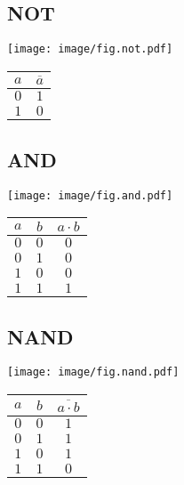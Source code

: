 
\begin{multicols}{4}

	\subsection*{NOT}
	\begin{minipage}[t][2em][c]{\linewidth}
		\centering
		\texttt{[image: image/fig.not.pdf]}
	\end{minipage}
	\begin{center}
		\begin{tabular}{c|c}
			\toprule
			$a$ & $\overline{a}$ \\
			\midrule
			$0$ & $1$            \\
			$1$ & $0$            \\
			\bottomrule
		\end{tabular}
	\end{center}

	\newcolumn

	\subsection*{AND}

	\begin{minipage}[t][2em][c]{\linewidth}
		\centering
		\texttt{[image: image/fig.and.pdf]}
	\end{minipage}
	\begin{center}
		\begin{tabular}{cc|c}
			\toprule
			$a$ & $b$ & $a\cdot b$ \\
			\midrule
			$0$ & $0$ & $0$        \\
			$0$ & $1$ & $0$        \\
			$1$ & $0$ & $0$        \\
			$1$ & $1$ & $1$        \\
			\bottomrule
		\end{tabular}
	\end{center}

	\subsection*{NAND}
	\begin{minipage}[t][2em][c]{\linewidth}
		\centering
		\texttt{[image: image/fig.nand.pdf]}
	\end{minipage}
	\begin{center}
		\begin{tabular}{cc|c}
			\toprule
			$a$ & $b$ & $\overline{a\cdot b}$ \\
			\midrule
			$0$ & $0$ & $1$                   \\
			$0$ & $1$ & $1$                   \\
			$1$ & $0$ & $1$                   \\
			$1$ & $1$ & $0$                   \\
			\bottomrule
		\end{tabular}
	\end{center}


\end{multicols}
